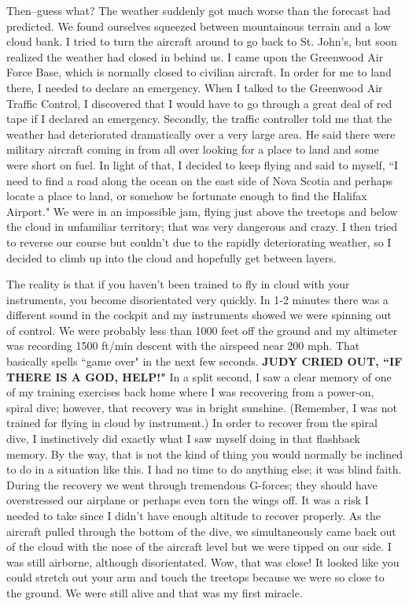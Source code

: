 \documentclass[oneside,12pt]{book}
\begin{document}
Then--guess what? The weather suddenly got much worse than the forecast had predicted. We found ourselves squeezed between mountainous terrain and a low cloud bank. I tried to turn the aircraft around to go back to St. John's, but soon realized the weather had closed in behind us. I  came upon the Greenwood Air Force Base, which is normally closed to civilian aircraft. In order for me to land there, I needed to declare an emergency. When I talked to the Greenwood Air Traffic Control, I discovered that I would have to go through a great deal of red tape if I declared an emergency. Secondly, the traffic controller told me that the weather had deteriorated dramatically over a very large area. He said there were military aircraft coming in from all over looking for a place to land and some were short on fuel. In light of that, I decided to keep flying and said to myself, ``I need to find a road along the ocean on the east side of Nova Scotia and perhaps locate a place to land, or somehow be fortunate enough to find the Halifax Airport." We were in an impossible jam, flying just above the treetops and below the cloud in unfamiliar territory; that was very dangerous and crazy. I then tried to reverse our course but couldn't due to the rapidly deteriorating weather, so I decided to climb up into the cloud and hopefully get between layers. 

The reality is that if you haven't been trained to fly in cloud with your instruments, you become disorientated very quickly. In 1-2 minutes there was a different sound in the cockpit and my instruments showed we were spinning out of control. We were probably less than 1000 feet off the ground and my altimeter was recording 1500 ft/min descent with the airspeed near 200 mph. That basically spells ``game over" in the next few seconds. \textbf{JUDY CRIED OUT, ``IF THERE IS A GOD, HELP!"} In a split second, I saw a clear memory of one of my training exercises back home where I was recovering from a power-on, spiral dive; however, that recovery was in bright sunshine. (Remember, I was not trained for flying in cloud by instrument.) In order to recover from the spiral dive, I instinctively did exactly what I saw myself doing in that flashback memory. By the way, that is not the kind of thing you would normally be inclined to do in a situation like this. I had no time to do anything else; it was blind faith. During the recovery we went through tremendous G-forces; they should have overstressed our airplane or perhaps even torn the wings off. It was a risk I needed to take since I didn't have enough altitude to recover properly. As the aircraft pulled through the bottom of the dive, we simultaneously came back out of the cloud with the nose of the aircraft level but we were tipped on our side. I was still airborne, although disorientated. Wow, that was close! It looked like you could stretch out your arm and touch the treetops because we were so close to the ground. We were still alive and that was my first miracle. 
\end{document}
